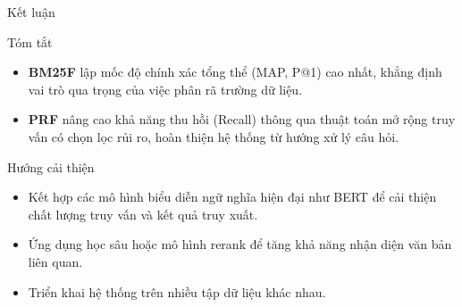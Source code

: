 \documentclass[10pt,aspectratio=169]{beamer}
\begin{document}
\begin{frame}{Kết luận}
\begin{block}{Tóm tắt}
\begin{itemize}
    \item \textbf{BM25F} lập mốc độ chính xác tổng thể (MAP, P@1) cao nhất, khẳng định vai trò qua trọng của việc phân rã trường dữ liệu.
    \item \textbf{PRF} nâng cao khả năng thu hồi (Recall) thông qua thuật toán mở rộng truy vấn có chọn lọc rủi ro, hoàn thiện hệ thống từ hướng xử lý câu hỏi.
\end{itemize}
\end{block}
\vspace{1em}
\begin{block}{Hướng cải thiện}
\begin{itemize}
    \item Kết hợp các mô hình biểu diễn ngữ nghĩa hiện đại như BERT để cải thiện chất lượng truy vấn và kết quả truy xuất.
    \item Ứng dụng học sâu hoặc mô hình rerank để tăng khả năng nhận diện văn bản liên quan.
    \item Triển khai hệ thống trên nhiều tập dữ liệu khác nhau.
\end{itemize}
\end{block}
\end{frame}
\end{document}
